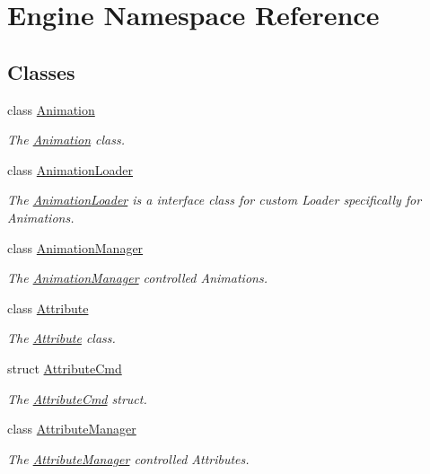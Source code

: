 \hypertarget{namespaceEngine}{}\section{Engine Namespace Reference}
\label{namespaceEngine}
\subsection*{Classes}
\begin{DoxyCompactItemize}
\item 
class \hyperlink{classEngine_1_1Animation}{Animation}
\begin{DoxyCompactList}\small\item\em The \hyperlink{classEngine_1_1Animation}{Animation} class. \end{DoxyCompactList}\item 
class \hyperlink{classEngine_1_1AnimationLoader}{Animation\+Loader}
\begin{DoxyCompactList}\small\item\em The \hyperlink{classEngine_1_1AnimationLoader}{Animation\+Loader} is a interface class for custom Loader specifically for Animations. \end{DoxyCompactList}\item 
class \hyperlink{classEngine_1_1AnimationManager}{Animation\+Manager}
\begin{DoxyCompactList}\small\item\em The \hyperlink{classEngine_1_1AnimationManager}{Animation\+Manager} controlled Animations. \end{DoxyCompactList}\item 
class \hyperlink{classEngine_1_1Attribute}{Attribute}
\begin{DoxyCompactList}\small\item\em The \hyperlink{classEngine_1_1Attribute}{Attribute} class. \end{DoxyCompactList}\item 
struct \hyperlink{structEngine_1_1AttributeCmd}{Attribute\+Cmd}
\begin{DoxyCompactList}\small\item\em The \hyperlink{structEngine_1_1AttributeCmd}{Attribute\+Cmd} struct. \end{DoxyCompactList}\item 
class \hyperlink{classEngine_1_1AttributeManager}{Attribute\+Manager}
\begin{DoxyCompactList}\small\item\em The \hyperlink{classEngine_1_1AttributeManager}{Attribute\+Manager} controlled Attributes. \end{DoxyCompactList}\item 

\end{DoxyCompactItemize}
